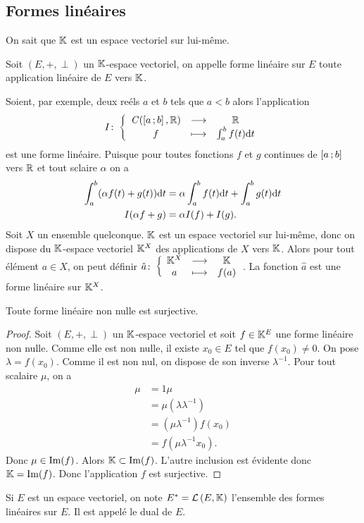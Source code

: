 \subsection{Formes linéaires}
On sait que $\mathbb{K}$ est un espace vectoriel sur lui-même.
\begin{defdef}
  Soit $(E,+,\perp)$ un $\mathbb{K}$-espace vectoriel, on appelle forme linéaire sur $E$ toute application linéaire de $E$ vers $\mathbb{K}$.
\end{defdef}

Soient, par exemple, deux reéls $a$ et $b$ tels que $a<b$ alors l'application
\begin{equation}
 I\colon \left\{\begin{array}{ccc} \mathit{C}(\left[ a \, ;  b \right],\mathbb{R}) & \longrightarrow &\mathbb{R}\\ f & \longmapsto & \int_{a}^b f(t)\mathrm{d} t \end{array} \right.
\end{equation}
est une forme linéaire. Puisque pour toutes fonctions $f$ et $g$ continues de $\left[ a \, ;  b \right]$ vers $\mathbb{R}$ et tout sclaire $\alpha$ on a
\begin{align}
  \int_{a}^b (\alpha f(t)+g(t))\mathrm{d} t &= \alpha \int_{a}^b f(t)\mathrm{d} t + \int_{a}^b g(t)\mathrm{d} t \\
  I(\alpha f+g)&=\alpha I(f)+I(g).
\end{align}
Soit $X$ un ensemble quelconque. $\mathbb{K}$ est un espace vectoriel sur lui-même, donc on dispose du $\mathbb{K}$-espace vectoriel $\mathbb{K}^X$ des applications de $X$ vers $\mathbb{K}$. Alors pour tout élément $a \in X$, on peut définir $\hat{a}\colon \left\{\begin{array}{ccc} \mathbb{K}^X & \longrightarrow &\mathbb{K}\\ a & \longmapsto & f(a) \end{array} \right.$. La fonction $\hat{a}$ est une forme linéaire sur $\mathbb{K}^X$.
\begin{theo}
  Toute forme linéaire non nulle est surjective.
\end{theo}
\begin{proof}
  Soit $(E,+,\perp)$ un $\mathbb{K}$-espace vectoriel et soit $f \in \mathbb{K}^E$ une forme linéaire non nulle. Comme elle est non nulle, il existe $x_0 \in E$ tel que $f(x_0)\neq 0$. On pose $\lambda =f(x_0)$. Comme il est non nul, on dispose de son inverse $\lambda^{-1}$. Pour tout scalaire $\mu$, on a
  \begin{align}
    \mu & =1 \mu \\
    &= \mu (\lambda \lambda^{-1})\\
    &=(\mu\lambda^{-1})f(x_0)\\
    &=f(\mu\lambda^{-1}x_0).
  \end{align}
  Donc $\mu \in \operatorname{Im}(f)$. Alors $\mathbb{K} \subset \operatorname{Im}(f)$. L'autre inclusion est évidente donc $\mathbb{K}=\operatorname{Im}(f)$. Donc l'application $f$ est surjective.
\end{proof}

Si $E$ est un espace vectoriel, on note $E^*=\mathcal{L}\left(E,\mathbb{K}\right)$ l'ensemble des formes linéaires sur $E$. Il est appelé le dual de $E$.


